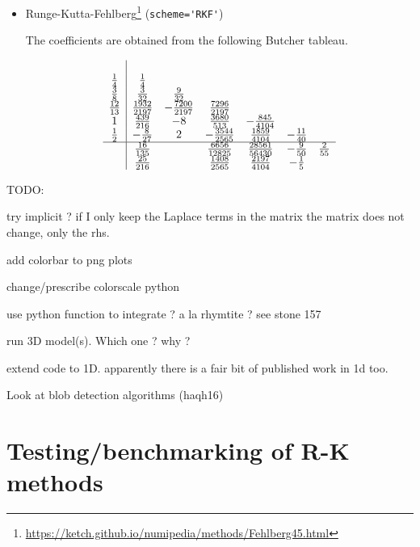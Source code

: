 \begin{itemize}
\item Runge-Kutta-Fehlberg\footnote{\url{https://ketch.github.io/numipedia/methods/Fehlberg45.html}} 
(\lstinline{scheme='RKF'})

The coefficients are obtained from the following Butcher tableau.

\begin{align} 
\begin{array}{c|cccccc} 
& & & & & & \\ 
\frac{1}{4} & \frac{1}{4} & & & & & \\ 
\frac{3}{8} & \frac{3}{32} & \frac{9}{32} & & & & \\ 
\frac{12}{13} & \frac{1932}{2197} & - \frac{7200}{2197} & \frac{7296}{2197} & & & \\ 
1 & \frac{439}{216} & -8 & \frac{3680}{513} & - \frac{845}{4104} & & \\ 
\frac{1}{2} & - \frac{8}{27} & 2 & - \frac{3544}{2565} & \frac{1859}{4104} & - \frac{11}{40} & \\ 
\hline & \frac{16}{135} & & \frac{6656}{12825} & \frac{28561}{56430} & - \frac{9}{50} & \frac{2}{55}\\ 
& \frac{25}{216} & & \frac{1408}{2565} & \frac{2197}{4104} & - \frac{1}{5} & 
\end{array}
\end{align}


\end{itemize}

TODO:

try implicit ? if I only keep the Laplace terms in the matrix the matrix does not change, only the rhs.

add colorbar to png plots

change/prescribe colorscale python

use python function to integrate ? a la rhymtite ? see stone 157

run 3D model(s). Which one ? why ?

extend code to 1D. apparently there is a fair bit of published work in 1d too.

Look at blob detection algorithms (haqh16) 

\newpage
\section*{Testing/benchmarking of R-K methods}

